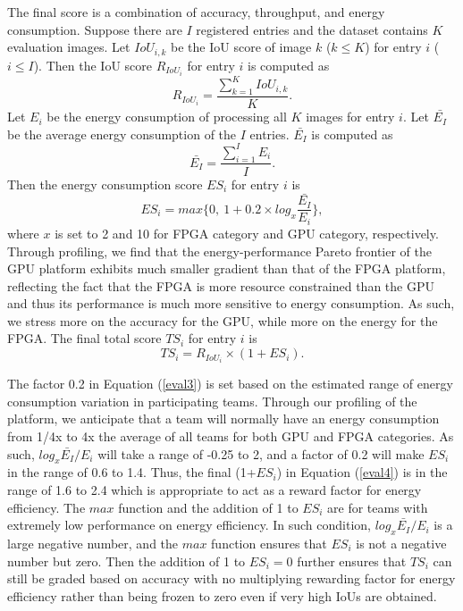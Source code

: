 \documentclass[10pt,journal,compsoc]{IEEEtran}
\begin{document}
The final score is a combination of accuracy, throughput, and energy consumption.
Suppose there are $I$ registered entries and the dataset contains $K$ evaluation images.
Let $IoU_{i,k}$ be the IoU score of image $k$ ($k \leq K$) for entry $i$ ($i\leq I$).
Then the IoU score $R_{IoU_{i}}$ for entry $i$ is computed as
\begin{equation}\label{eval1}
R_{IoU_{i}} = \frac{\sum_{k=1}^{K}IoU_{i,k}}{K}.
\end{equation}
Let $E_i$ be the energy consumption of processing all $K$ images for entry $i$.
Let $\bar{E_I}$ be the average energy consumption of the $I$ entries.
$\bar{E_I}$ is computed as
\begin{equation}\label{eval2}
\bar{E_I} = \frac{\sum_{i=1}^{I}E_{i}}{I}.
\end{equation}
Then the energy consumption score $ES_i$ for entry $i$ is
\begin{equation}\label{eval3}
{ES_i} = max\{0, ~1+0.2\times log_x\frac{\bar{E_{I}}}{E_i}\},
\end{equation}
where $x$ is set to 2 and 10 for FPGA category and GPU category, respectively.
Through profiling, we find that the energy-performance Pareto frontier of the GPU platform exhibits much smaller gradient than that of the FPGA platform, reflecting the fact that the FPGA is more resource constrained than the GPU and thus its performance is much more sensitive to energy consumption. As such, we stress more on the accuracy for the GPU, while more on the energy for the FPGA.
The final total score $TS_i$ for entry $i$ is
\begin{equation}\label{eval4}
{TS_i} = R_{IoU_i}\times (1+{ES_i}).
\end{equation}

The factor 0.2 in Equation (\ref{eval3}) is set based on the estimated range of energy consumption variation in participating teams.
Through our profiling of the platform, we anticipate that a team will normally have an energy consumption from 1/4x to 4x the average of all teams for both GPU and FPGA categories.
As such, $log_{x}\bar{E_I}/E_{i}$ will take a range of -0.25 to 2, and a factor of 0.2 will make $ES_{i}$ in the range of 0.6 to 1.4.
Thus, the final (1+$ES_{i}$) in Equation (\ref{eval4}) is in the range of 1.6 to 2.4 which is appropriate to act as a reward factor for energy efficiency.
The $max$ function and the addition of 1 to $ES_{i}$ are for teams with extremely low performance on energy efficiency.
In such condition, $log_{x}\bar{E_I}/E_{i}$ is a large negative number, and the $max$ function ensures that $ES_{i}$ is not a negative number but zero.
Then the addition of 1 to $ES_{i}=0$ further ensures that $TS_{i}$ can still be graded based on accuracy with no multiplying rewarding factor for energy efficiency rather than being frozen to zero even if very high IoUs are obtained.
\end{document}

